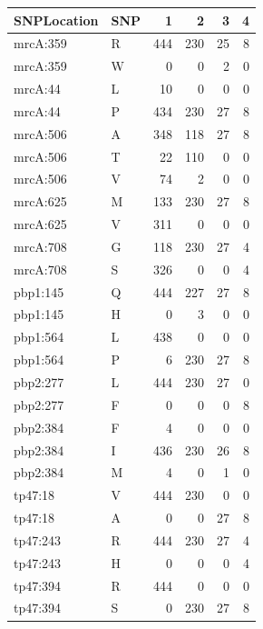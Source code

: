 \begin{table}[ht]
\centering
\begin{tabular}{llrrrr}
  \toprule
SNPLocation & SNP & 1 & 2 & 3 & 4 \\ 
  \midrule
mrcA:359 & R & 444 & 230 & 25 & 8 \\ 
  mrcA:359 & W & 0 & 0 & 2 & 0 \\ 
  mrcA:44 & L & 10 & 0 & 0 & 0 \\ 
  mrcA:44 & P & 434 & 230 & 27 & 8 \\ 
  mrcA:506 & A & 348 & 118 & 27 & 8 \\ 
  mrcA:506 & T & 22 & 110 & 0 & 0 \\ 
  mrcA:506 & V & 74 & 2 & 0 & 0 \\ 
  mrcA:625 & M & 133 & 230 & 27 & 8 \\ 
  mrcA:625 & V & 311 & 0 & 0 & 0 \\ 
  mrcA:708 & G & 118 & 230 & 27 & 4 \\ 
  mrcA:708 & S & 326 & 0 & 0 & 4 \\ 
  pbp1:145 & Q & 444 & 227 & 27 & 8 \\ 
  pbp1:145 & H & 0 & 3 & 0 & 0 \\ 
  pbp1:564 & L & 438 & 0 & 0 & 0 \\ 
  pbp1:564 & P & 6 & 230 & 27 & 8 \\ 
  pbp2:277 & L & 444 & 230 & 27 & 0 \\ 
  pbp2:277 & F & 0 & 0 & 0 & 8 \\ 
  pbp2:384 & F & 4 & 0 & 0 & 0 \\ 
  pbp2:384 & I & 436 & 230 & 26 & 8 \\ 
  pbp2:384 & M & 4 & 0 & 1 & 0 \\ 
  tp47:18 & V & 444 & 230 & 0 & 0 \\ 
  tp47:18 & A & 0 & 0 & 27 & 8 \\ 
  tp47:243 & R & 444 & 230 & 27 & 4 \\ 
  tp47:243 & H & 0 & 0 & 0 & 4 \\ 
  tp47:394 & R & 444 & 0 & 0 & 0 \\ 
  tp47:394 & S & 0 & 230 & 27 & 8 \\ 
   \bottomrule
\end{tabular}
\end{table}
